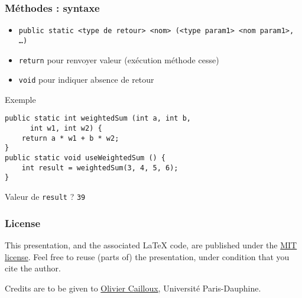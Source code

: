 \documentclass[english, french]{beamer}
\begin{document}
\begin{frame}[fragile]
	\frametitle{Méthodes : syntaxe}
	\begin{itemize}
		\item \texttt{public static <type de retour> <nom> (<type param1> <nom param1>, …)}
		\item \texttt{return} pour renvoyer valeur (exécution méthode cesse)
		\item \texttt{void} pour indiquer absence de retour
	\end{itemize}
	\begin{block}{Exemple}
		\begin{lstlisting}
public static int weightedSum (int a, int b, 
      int w1, int w2) {
	return a * w1 + b * w2;
}
public static void useWeightedSum () {
	int result = weightedSum(3, 4, 5, 6);
}
		\end{lstlisting}	
	\end{block}
	Valeur de \texttt{result} ? \pause \texttt{39}
\end{frame}

\appendix
\makeatletter
\def\insertframenumber{\@roman\c@framenumber}
\def\inserttotalframenumber{\@roman\c@framenumber}
\makeatother
\AtBeginSection{
}

\clearpage{}
\begin{frame}[plain]
	\frametitle{License}
	This presentation, and the associated \LaTeX{} code, are published under the \href{https://opensource.org/licenses/MIT}{MIT license}. Feel free to reuse (parts of) the presentation, under condition that you cite the author.
	
	Credits are to be given to \href{http://www.lamsade.dauphine.fr/~ocailloux/}{Olivier Cailloux}, Université Paris-Dauphine.
\end{frame}
\addtocounter{framenumber}{-1}
\end{document}
